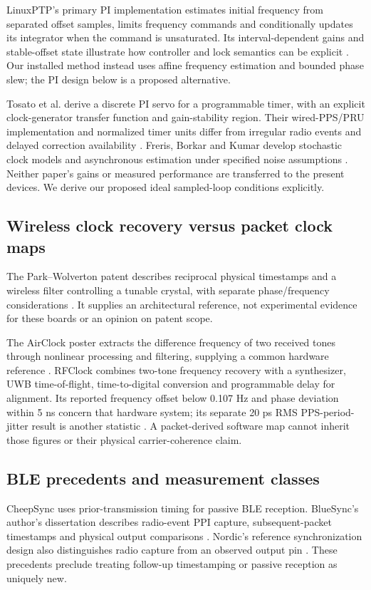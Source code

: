 \documentclass[11pt,letterpaper]{article}
\begin{document}
LinuxPTP's primary PI implementation estimates initial frequency from separated offset samples, limits frequency commands and conditionally updates its integrator when the command is unsaturated. Its interval-dependent gains and stable-offset state illustrate how controller and lock semantics can be explicit \cite{linuxptp}. Our installed method instead uses affine frequency estimation and bounded phase slew; the PI design below is a proposed alternative.

Tosato et al. derive a discrete PI servo for a programmable timer, with an explicit clock-generator transfer function and gain-stability region. Their wired-PPS/PRU implementation and normalized timer units differ from irregular radio events and delayed correction availability \cite{tosato}. Freris, Borkar and Kumar develop stochastic clock models and asynchronous estimation under specified noise assumptions \cite{freris}. Neither paper's gains or measured performance are transferred to the present devices. We derive our proposed ideal sampled-loop conditions explicitly.

\subsection{Wireless clock recovery versus packet clock maps}
The Park--Wolverton patent describes reciprocal physical timestamps and a wireless filter controlling a tunable crystal, with separate phase/frequency considerations \cite{patent}. It supplies an architectural reference, not experimental evidence for these boards or an opinion on patent scope.

The AirClock poster extracts the difference frequency of two received tones through nonlinear processing and filtering, supplying a common hardware reference \cite{airclock}. RFClock combines two-tone frequency recovery with a synthesizer, UWB time-of-flight, time-to-digital conversion and programmable delay for alignment. Its reported frequency offset below 0.107 Hz and phase deviation within 5 ns concern that hardware system; its separate 20 ps RMS PPS-period-jitter result is another statistic \cite{rfclock}. A packet-derived software map cannot inherit those figures or their physical carrier-coherence claim.

\subsection{BLE precedents and measurement classes}
CheepSync uses prior-transmission timing for passive BLE reception. BlueSync's author's dissertation describes radio-event PPI capture, subsequent-packet timestamps and physical output comparisons \cite{cheep,blue}. Nordic's reference synchronization design also distinguishes radio capture from an observed output pin \cite{nordic}. These precedents preclude treating follow-up timestamping or passive reception as uniquely new.
\end{document}
